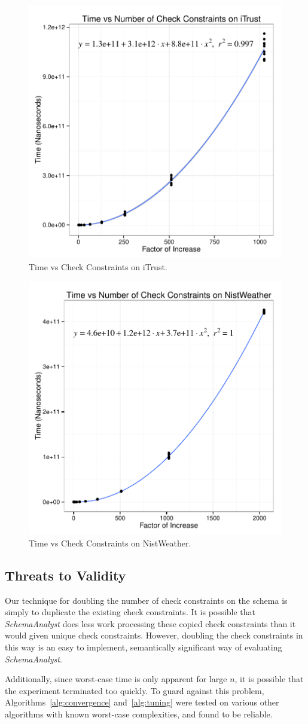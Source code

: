 \begin{figure}
\centering
  \centering
  \includegraphics[width=.5\linewidth]{../results/iTrustChecks.pdf}
  \caption{Time vs Check Constraints on iTrust.}
  \label{fig:iTrust}
\end{figure}
\begin{figure}
  \centering
  \includegraphics[width=.5\linewidth]{../results/NistWeatherChecks.pdf}
  \caption{Time vs Check Constraints on NistWeather.}
  \label{fig:NistWeather}
\end{figure}

\subsection*{Threats to Validity}

Our technique for doubling the number of check constraints on the schema
is simply to duplicate the existing check constraints. It is possible
that \textit{SchemaAnalyst} does less work processing these copied check
constraints than it would given unique check constraints. However,
doubling the check constraints in this way is an easy to implement,
semantically significant way of evaluating \textit{SchemaAnalyst}.

Additionally, since worst-case time is only apparent for large $n$, 
it is possible that the experiment terminated too quickly.  To guard 
against this problem, Algorithms~\ref{alg:convergence} and~\ref{alg:tuning}
were tested on various other algorithms with known worst-case complexities, and 
found to be reliable.
